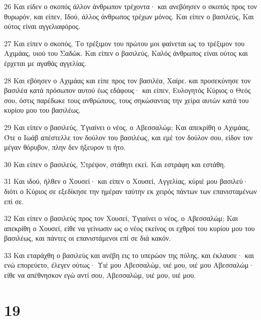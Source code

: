 \par 26 Και είδεν ο σκοπός άλλον άνθρωπον τρέχοντα· και ανεβόησεν ο σκοπός προς τον θυρωρόν, και είπεν, Ιδού, άλλος άνθρωπος τρέχων μόνος. Και είπεν ο βασιλεύς, Και ούτος είναι αγγελιαφόρος.
\par 27 Και είπεν ο σκοπός, Το τρέξιμον του πρώτου μοι φαίνεται ως το τρέξιμον του Αχιμάας, υιού του Σαδώκ. Και είπεν ο βασιλεύς, Καλός άνθρωπος είναι ούτος και έρχεται με αγαθάς αγγελίας.
\par 28 Και εβόησεν ο Αχιμάας και είπε προς τον βασιλέα, Χαίρε. και προσεκύνησε τον βασιλέα κατά πρόσωπον αυτού έως εδάφους· και είπεν, Ευλογητός Κύριος ο Θεός σου, όστις παρέδωκε τους ανθρώπους, τους σηκώσαντας την χείρα αυτών κατά του κυρίου μου του βασιλέως.
\par 29 Και είπεν ο βασιλεύς, Υγιαίνει ο νέος, ο Αβεσσαλώμ; Και απεκρίθη ο Αχιμάας, Ότε ο Ιωάβ απέστελλε τον δούλον του βασιλέως, και εμέ τον δούλον σου, είδον τον μέγαν θόρυβον, πλην δεν ήξευρον τι ήτο.
\par 30 Και είπεν ο βασιλεύς, Στρέψον, στάθητι εκεί. Και εστράφη και εστάθη.
\par 31 Και ιδού, ήλθεν ο Χουσεί· και είπεν ο Χουσεί, Αγγελίας, κύριέ μου βασιλεύ· διότι ο Κύριος σε εξεδίκησε την ημέραν ταύτην εκ χειρός πάντων των επανισταμένων επί σε.
\par 32 Και είπεν ο βασιλεύς προς τον Χουσεί, Υγιαίνει ο νέος, ο Αβεσσαλώμ; Και απεκρίθη ο Χουσεί, είθε να γείνωσιν ως ο νέος εκείνος οι εχθροί του κυρίου μου του βασιλέως, και πάντες οι επανιστάμενοι επί σε διά κακόν.
\par 33 Και εταράχθη ο βασιλεύς και ανέβη εις το υπερώον της πύλης, και έκλαυσε· και ενώ επορεύετο, έλεγεν ούτως· Υιέ μου Αβεσσαλώμ, υιέ μου, υιέ μου Αβεσσαλώμ· είθε να απέθνησκον εγώ αντί σου, Αβεσσαλώμ, υιέ μου, υιέ μου.

\chapter{19}

